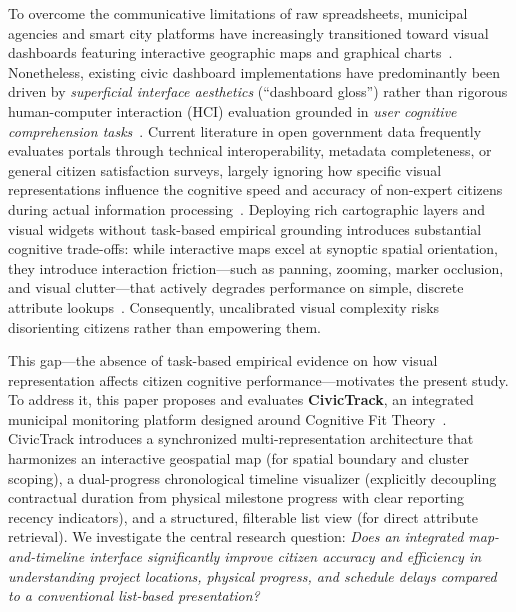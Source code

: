 \documentclass[runningheads]{llncs}
\begin{document}
To overcome the communicative limitations of raw spreadsheets, municipal agencies and smart city platforms have increasingly transitioned toward visual dashboards featuring interactive geographic maps and graphical charts~\cite{soni2024survey,kytta2023prioritizing}. Nonetheless, existing civic dashboard implementations have predominantly been driven by \emph{superficial interface aesthetics} (``dashboard gloss'') rather than rigorous human-computer interaction (HCI) evaluation grounded in \emph{user cognitive comprehension tasks}~\cite{chokki2022engaging}. Current literature in open government data frequently evaluates portals through technical interoperability, metadata completeness, or general citizen satisfaction surveys, largely ignoring how specific visual representations influence the cognitive speed and accuracy of non-expert citizens during actual information processing~\cite{nikiforova2021open,lehto2022landscape}. Deploying rich cartographic layers and visual widgets without task-based empirical grounding introduces substantial cognitive trade-offs: while interactive maps excel at synoptic spatial orientation, they introduce interaction friction---such as panning, zooming, marker occlusion, and visual clutter---that actively degrades performance on simple, discrete attribute lookups~\cite{johnson2024enhancing}. Consequently, uncalibrated visual complexity risks disorienting citizens rather than empowering them.

This gap---the absence of task-based empirical evidence on how visual representation affects citizen cognitive performance---motivates the present study. To address it, this paper proposes and evaluates \textbf{CivicTrack}, an integrated municipal monitoring platform designed around Cognitive Fit Theory~\cite{bina2023incorporating,bacic2022advancing}. CivicTrack introduces a synchronized multi-representation architecture that harmonizes an interactive geospatial map (for spatial boundary and cluster scoping), a dual-progress chronological timeline visualizer (explicitly decoupling contractual duration from physical milestone progress with clear reporting recency indicators), and a structured, filterable list view (for direct attribute retrieval). We investigate the central research question: \emph{Does an integrated map-and-timeline interface significantly improve citizen accuracy and efficiency in understanding project locations, physical progress, and schedule delays compared to a conventional list-based presentation?} 
\end{document}
